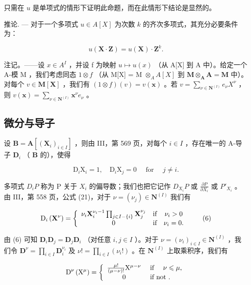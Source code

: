 只需在 \(u\) 是单项式的情形下证明此命题，而在此情形下结论是显然的。

推论. --- 对于一个多项式 \(u \in A[X]\) 为次数 \(k\) 的齐次多项式，其充分必要条件为：

\[
u (\mathbf {X} \cdot \mathbf {Z}) = u (\mathbf {X}) \cdot \mathbf {Z} ^ {k}.
\]

注记。——设 \(x \in A^{I}\) ，并设 f 为映射 \(u \mapsto u(x)\) （从 A{[}X{]} 到 A 中）。给定一个 A-模 M ，我们考虑同态 \(1 \otimes f\) （从 M{[}X{]} = M \(\otimes_{A} A[X]\) 到 \(\mathbf{M} \otimes_{\mathbf{A}} \mathbf{A} = \mathbf{M}\) 中）。对每个 \(v \in \mathbf{M}[\mathbf{X}]\) ，我们有 \((1 \otimes f)(v) = v(\mathbf{x})\) 。若 \(v = \sum_{\nu \in \mathbf{N}^{(I)}} e_{\nu} X^{\nu}\) ，则 \(v(\mathbf{x}) = \sum_{\nu \in \mathbf{N}^{(I)}} \mathbf{x}^{\nu} e_{\nu}\) 。

\subsection{微分与导子}

设 \(\mathbf{B} = \mathbf{A}[(\mathbf{X}_i)_{i\in I}]\) ，则由 III，第 569 页，对每个 \(i\in I\) ，存在唯一的 A-导子 \(\mathbf{D}_i\) （ \(\mathbf{B}\) 的），使得

\[
\mathrm{D} _ {i} \mathrm{X} _ {i} = 1, \quad \mathrm{D} _ {i} \mathrm{X} _ {j} = 0 \quad \text { for } \quad j \neq i.\tag{5}
\]

多项式 \(D_{i}P\) 称为 P 关于 \(X_{i}\) 的偏导数；我们也把它记作 \(D_{X_{i}}P\) 或 \(\frac{\partial P}{\partial X_{i}}\) 或 \(P'_{X_{i}}\) 。由 III，第 558 页，公式 (21)，对于 \(\nu = (\nu_{j}) \in \mathbf{N}^{(I)}\) 我们有

\[
\mathrm{D} _ {i} \left(\mathbf {X} ^ {\nu}\right) = \left\{ \begin{array}{c c c} \nu_ {i} \mathbf {X} _ {i} ^ {\nu_ {i} - 1} \prod_ {j \in I - \{i \}} \mathbf {X} _ {j} ^ {\nu_ {j}} & \text {if} & \nu_ {i} > 0 \\ 0 & \text {if} & \nu_ {i} = 0. \end{array} \right.\tag{6}
\]

由 (6) 可知 \(\mathbf{D}_i\mathbf{D}_j = \mathbf{D}_j\mathbf{D}_i\) （对任意 \(i, j \in I\) ）。对于 \(\nu = (\nu_i)_{i \in I} \in \mathbf{N}^{(I)}\) ，我们令 \(\mathbf{D}^{\nu} = \prod_{i \in I} \mathbf{D}_i^{\nu_i}\) 及 \(\nu! = \prod_{i \in I} (\nu_i!)\) 。在 \(\mathbf{N}^{(I)}\) 上取乘积序，我们有

\[
\mathrm{D} ^ {\nu} \left(\mathrm{X} ^ {\mu}\right) = \left\{ \begin{array}{c l} \frac {\mu !}{(\mu - \nu) !} \mathrm{X} ^ {\mu - \nu} & \text { if } \quad \nu \leqslant \mu , \\ 0 & \text { if   not }. \end{array} \right.
\]

